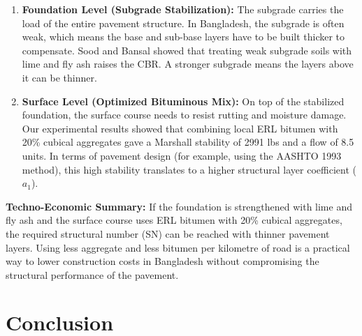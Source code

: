 \documentclass[12pt,a4paper]{article}
\begin{document}
\begin{enumerate}
    \item \textbf{Foundation Level (Subgrade Stabilization):} The subgrade carries the load of the entire pavement structure. In Bangladesh, the subgrade is often weak, which means the base and sub-base layers have to be built thicker to compensate. Sood and Bansal \cite{sood2015evaluation} showed that treating weak subgrade soils with lime and fly ash raises the CBR. A stronger subgrade means the layers above it can be thinner.
    \item \textbf{Surface Level (Optimized Bituminous Mix):} On top of the stabilized foundation, the surface course needs to resist rutting and moisture damage. Our experimental results showed that combining local ERL bitumen with 20\% cubical aggregates gave a Marshall stability of 2991 lbs and a flow of 8.5 units. In terms of pavement design (for example, using the AASHTO 1993 method), this high stability translates to a higher structural layer coefficient ($a_1$).
\end{enumerate}

\textbf{Techno-Economic Summary:}
If the foundation is strengthened with lime and fly ash and the surface course uses ERL bitumen with 20\% cubical aggregates, the required structural number (SN) can be reached with thinner pavement layers. Using less aggregate and less bitumen per kilometre of road is a practical way to lower construction costs in Bangladesh without compromising the structural performance of the pavement.

\section{Conclusion}
\end{document}
